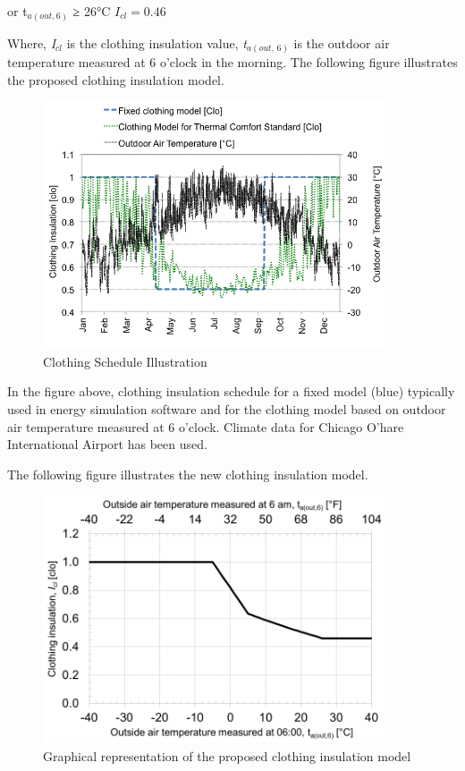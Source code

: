 or t\(_{a(out,6)}\) ≥ 26°C \({I_{cl}} = 0.46\)

Where, \emph{I\(_{cl}\)} is the clothing insulation value, \emph{t\(_{a(out,\, 6)}\)} is the outdoor air temperature measured at 6 o'clock in the morning. The following figure illustrates the proposed clothing insulation model.

\begin{figure}[hbtp] %
\centering
\includegraphics[width=0.9\textwidth, height=0.9\textheight, keepaspectratio=true]{media/image6825.png}
\caption{Clothing Schedule Illustration \protect \label{fig:clothing-schedule-illustration}}
\end{figure}

In the figure above, clothing insulation schedule for a fixed model (blue) typically used in energy simulation software and for the clothing model based on outdoor air temperature measured at 6 o'clock. Climate data for Chicago O'hare International Airport has been used.

The following figure illustrates the new clothing insulation model.

\begin{figure}[hbtp] %
\centering
\includegraphics[width=0.9\textwidth, height=0.9\textheight, keepaspectratio=true]{media/image6826.png}
\caption{Graphical representation of the proposed clothing insulation model \protect \label{fig:graphical-representation-of-the-proposed}}
\end{figure}

